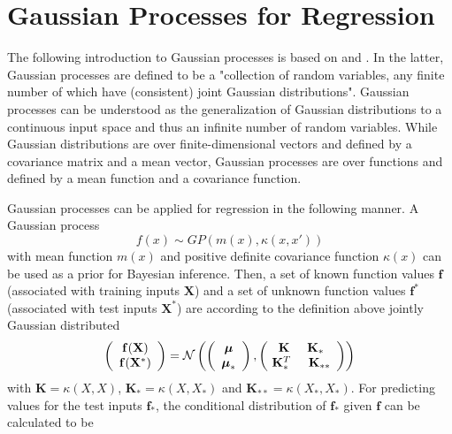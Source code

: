 \documentclass[../main.tex]{subfiles}
\begin{document}
\section{Gaussian Processes for Regression}
The following introduction to Gaussian processes is based on \cite{murphy2012machine} and \cite{rasmussen2006gaussian}. In the latter, Gaussian processes are defined to be a "collection of random variables, any finite number of which have (consistent) joint Gaussian distributions". Gaussian processes can be understood as the generalization of Gaussian distributions to a continuous input space and thus an infinite number of random variables. While Gaussian distributions are over finite-dimensional vectors and defined by a covariance matrix and a mean vector, Gaussian processes are over functions and defined by a mean function and a covariance function.\par
Gaussian processes can be applied for regression in the following manner. A Gaussian process 
\begin{equation}
    f(x) \sim GP(m(x),\kappa(x,x'))
\end{equation}
with mean function $m(x)$ and positive definite covariance function $\kappa(x)$ can be used as a prior for Bayesian inference. Then, a set of known function values $\mathbf{f}$ (associated with training inputs $\mathbf{X}$) and a set of unknown function values $\mathbf{f^*}$ (associated with test inputs $\mathbf{X^*}$) are according to the definition above jointly Gaussian distributed
\begin{equation}
    \left(
    \begin{array}{c}
      \mathbf{f(\mathbf{X})} \\\mathbf{f(\mathbf{X^*})}
    \end{array}
 \right) = \mathcal{N}
 \left(\left( 
  \begin{array}{c}
  \boldsymbol{\mu} \\ \boldsymbol{\mu}_* 
  \end{array}
  \right),
  \left(\!
  \begin{array}{c}
  \mathbf{K} \hspace{0.5cm} \mathbf{K}_* \\
  \mathbf{K}^T_* \hspace{0.5cm} \mathbf{K}_{**}  
  \end{array}
  \right)
  \right)
\end{equation}
with $\mathbf{K} = \kappa(X,X)$, $\mathbf{K_*} = \kappa(X,X_*)$ and $\mathbf{K_{**}} = \kappa(X_*,X_*)$. For predicting values for the test inputs $\mathbf{f}_*$, the conditional distribution of $\mathbf{f}_*$ given $\mathbf{f}$ can be calculated to be
\end{document}

